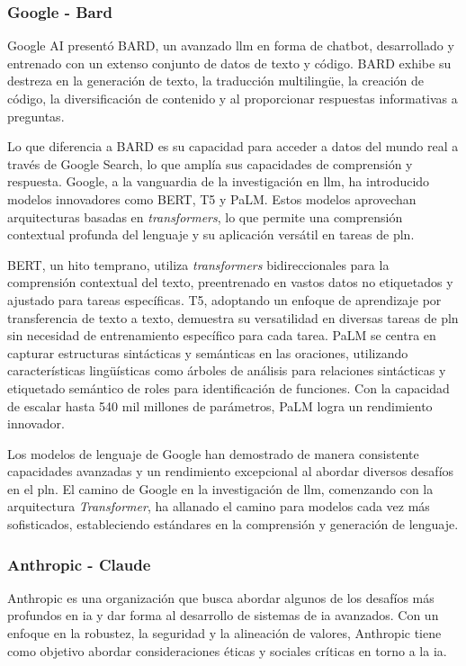 \subsubsection{Google - Bard}

Google AI presentó BARD, un avanzado \acrfull{llm} en forma de chatbot, desarrollado y entrenado con un extenso conjunto de datos de texto y código. BARD exhibe su destreza en la generación de texto, la traducción multilingüe, la creación de código, la diversificación de contenido y al proporcionar respuestas informativas a preguntas.

Lo que diferencia a BARD es su capacidad para acceder a datos del mundo real a través de Google Search, lo que amplía sus capacidades de comprensión y respuesta. Google, a la vanguardia de la investigación en \acrshort{llm}, ha introducido modelos innovadores como BERT, T5 y PaLM. Estos modelos aprovechan arquitecturas basadas en \textit{transformers}, lo que permite una comprensión contextual profunda del lenguaje y su aplicación versátil en tareas de \acrlong{pln}.

BERT, un hito temprano, utiliza \textit{transformers} bidireccionales para la comprensión contextual del texto, preentrenado en vastos datos no etiquetados y ajustado para tareas específicas. T5, adoptando un enfoque de aprendizaje por transferencia de texto a texto, demuestra su versatilidad en diversas tareas de \acrlong{pln} sin necesidad de entrenamiento específico para cada tarea. PaLM se centra en capturar estructuras sintácticas y semánticas en las oraciones, utilizando características lingüísticas como árboles de análisis para relaciones sintácticas y etiquetado semántico de roles para identificación de funciones. Con la capacidad de escalar hasta 540 mil millones de parámetros, PaLM logra un rendimiento innovador.

Los modelos de lenguaje de Google han demostrado de manera consistente capacidades avanzadas y un rendimiento excepcional al abordar diversos desafíos en el \acrshort{pln}. El camino de Google en la investigación de \acrshort{llm}, comenzando con la arquitectura \textit{Transformer}, ha allanado el camino para modelos cada vez más sofisticados, estableciendo estándares en la comprensión y generación de lenguaje.

\subsubsection{Anthropic - Claude}

Anthropic es una organización que busca abordar algunos de los desafíos más profundos en \acrlong{ia} y dar forma al desarrollo de sistemas de \acrshort{ia} avanzados. Con un enfoque en la robustez, la seguridad y la alineación de valores, Anthropic tiene como objetivo abordar consideraciones éticas y sociales críticas en torno a la \acrshort{ia}.

